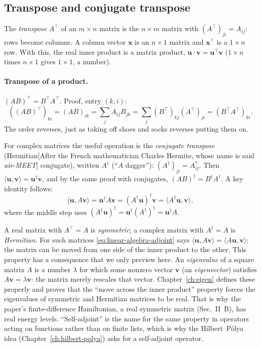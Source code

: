 \subsection{Transpose and conjugate transpose}

The \emph{transpose} $A^\top$ of an $m\times n$ matrix is the $n\times m$ matrix with $(A^\top)_{ji}=A_{ij}$: rows become columns. A column vector $\bm x$ is an $n\times1$ matrix and $\bm x^\top$ is a $1\times n$ row. With this, the real inner product is a matrix product, $\bm u\cdot\bm v=\bm u^\top\bm v$ ($1\times n$ times $n\times1$ gives $1\times1$, a number).

\paragraph{Transpose of a product.} $(AB)^\top=B^\top A^\top$. Proof, entry $(k,i)$:
\[
((AB)^\top)_{ki}=(AB)_{ik}=\sum_jA_{ij}B_{jk}=\sum_j(B^\top)_{kj}(A^\top)_{ji}=(B^\top A^\top)_{ki}.
\]
The order reverses, just as taking off shoes and socks reverses putting them on.

For complex matrices the useful operation is the \emph{conjugate transpose} (Hermitian[After the French mathematician Charles Hermite, whose name is said \emph{air-MEET}] conjugate), written $A^\dagger$ (``$A$ dagger''): $(A^\dagger)_{ji}=A_{ij}^*$. Then $\langle\bm u,\bm v\rangle=\bm u^\dagger\bm v$, and by the same proof with conjugates, $(AB)^\dagger=B^\dagger A^\dagger$. A key identity follows:
\begin{equation}
\langle\bm u,A\bm v\rangle=\bm u^\dagger A\bm v=(A^\dagger\bm u)^\dagger\bm v=\langle A^\dagger\bm u,\bm v\rangle ,
\label{eq:linear-algebra-adjoint}
\end{equation}
where the middle step uses $(A^\dagger\bm u)^\dagger=\bm u^\dagger(A^\dagger)^\dagger=\bm u^\dagger A$.

A real matrix with $A^\top=A$ is \emph{symmetric}; a complex matrix with $A^\dagger=A$ is \emph{Hermitian}. For such matrices \cref{eq:linear-algebra-adjoint} says $\langle\bm u,A\bm v\rangle=\langle A\bm u,\bm v\rangle$: the matrix can be moved from one side of the inner product to the other. This property has a consequence that we only preview here. An \emph{eigenvalue} of a square matrix $A$ is a number $\lambda$ for which some nonzero vector $\bm v$ (an \emph{eigenvector}) satisfies $A\bm v=\lambda\bm v$: the matrix merely rescales that vector. Chapter~\ref{ch:eigen} defines these properly and proves that the ``move across the inner product'' property forces the eigenvalues of symmetric and Hermitian matrices to be real. That is why the paper's finite-difference Hamiltonian, a real symmetric matrix (Sec.~II~B), has real energy levels. ``Self-adjoint'' is the name for the same property in operators acting on functions rather than on finite lists, which is why the Hilbert--P\'olya idea (Chapter~\ref{ch:hilbert-polya}) asks for a self-adjoint operator.

